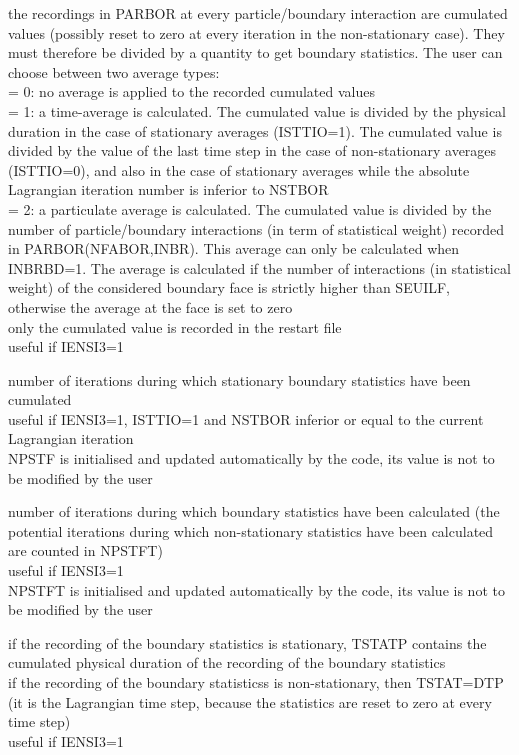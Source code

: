 {the recordings in PARBOR at every particle/boundary interaction are
cumulated values (possibly reset to zero at every iteration in the
non-stationary case). They must therefore be divided by a quantity to
get boundary statistics. The user can choose between two average types:\\
\hspace*{1.3cm} = 0: no average is applied to the recorded cumulated values\\
\hspace*{1.3cm} = 1: a time-average is calculated. The cumulated value
is divided by the physical duration in the case of stationary
averages (ISTTIO=1). The cumulated value is divided by the value of
the last time step in the case of non-stationary averages (ISTTIO=0),
and also in the case of stationary averages while the
absolute Lagrangian iteration number is inferior to NSTBOR\\
\hspace*{1.3cm} = 2: a particulate average is calculated. The cumulated
value is divided by the number of particle/boundary interactions (in term of
statistical weight) recorded in PARBOR(NFABOR,INBR). This average can only
be calculated when INBRBD=1. The average is calculated if the number
of interactions (in statistical weight) of the considered boundary face
is strictly higher than SEUILF, otherwise the average at the face is set
to zero\\
only the cumulated value is recorded in the restart file\\
useful if IENSI3=1}

{number of iterations during which stationary boundary statistics have
been cumulated\\
useful if IENSI3=1, ISTTIO=1 and NSTBOR inferior or equal to the
current Lagrangian iteration\\
NPSTF is initialised and updated automatically by the code, its value is not to
be modified by the user}

{number of iterations during which boundary statistics have
been calculated
(the potential iterations during which non-stationary
statistics have been calculated are counted in NPSTFT)\\
useful if IENSI3=1\\
NPSTFT is initialised and updated automatically by the code, its value is not to
be modified by the user}

{if the recording of the boundary statistics is stationary, TSTATP contains
the cumulated physical duration of the recording of the boundary statistics\\
if the recording of the boundary statisticss is non-stationary, then
TSTAT=DTP (it is the Lagrangian time step, because the
statistics are reset to zero at every time step)\\
useful if IENSI3=1}
